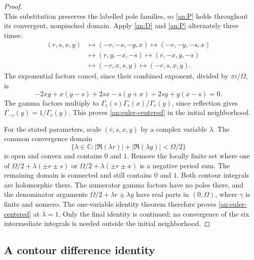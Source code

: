 \documentclass[11pt]{article}
\numberwithin{equation}{section}
\theoremstyle{definition}
\theoremstyle{remark}
\newcommand{\C}{\mathbb C}
\begin{document}
\begin{proof}
\begin{equation}
\end{equation}
This substitution preserves the labelled pole families, so
\eqref{an:P} holds throughout its convergent, nonpinched domain.
Apply \eqref{an:D} and \eqref{an:P} alternately three times:
\begin{align*}
 (r,s,x,y)&\longmapsto(-r,-s,-y,x)
 \longmapsto(-r,-y,-s,x)\\
 &\longmapsto(r,y,-x,-s)
 \longmapsto(r,-x,y,-s)\\
 &\longmapsto(-r,x,s,y)
 \longmapsto(-r,s,x,y).
\end{align*}
The exponential factors cancel, since their combined exponent,
divided by $\pi i/\Omega$, is
\[
 -2xy+x(y-s)+2sx-s(y+x)+2sy+y(x-s)=0.
\]
The gamma factors multiply to
$\Gamma_r(s)\Gamma_r(x)/\Gamma_r(y)$, since reflection gives
$\Gamma_{-r}(y)=1/\Gamma_r(y)$.  This proves
\eqref{an:euler-centered} in the initial neighborhood.

For the stated parameters, scale $(r,s,x,y)$ by a complex variable
$\lambda$.  The common convergence domain
\[
 \{\lambda\in\C:
       |\Re(\lambda r)|+|\Re(\lambda y)|<\Omega/2\}
\]
is open and convex and contains $0$ and $1$.  Remove the locally
finite set where one of
$\Omega/2+\lambda(\pm r\pm s)$ or
$\Omega/2+\lambda(\pm r\pm x)$ is a negative period sum.
The remaining domain is connected and still contains $0$ and $1$.
Both contour integrals are holomorphic there.  The numerator gamma
factors have no poles there, and the denominator arguments
$\Omega/2+\lambda r\pm\lambda y$ have real parts in $(0,\Omega)$,
where $\gamma$ is finite and nonzero.  The one-variable identity
theorem therefore proves \eqref{an:euler-centered} at $\lambda=1$.
Only the final identity is continued; no convergence of the six
intermediate integrals is needed outside the initial neighborhood.
\end{proof}

\subsection{A contour difference identity}
\label{an:four-term-section}
\end{document}
